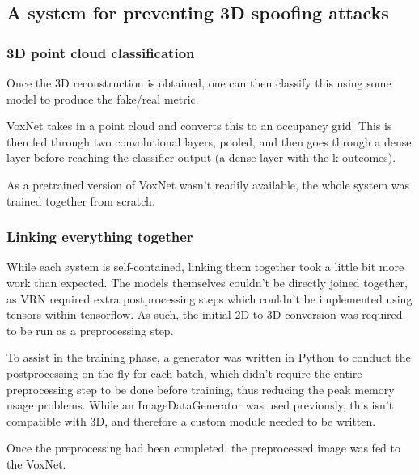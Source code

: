 \documentclass[10pt,a4paper]{article}
\begin{document}
        
    \subsection{A system for preventing 3D spoofing attacks}
        \subsubsection{3D point cloud classification}
            Once the 3D reconstruction is obtained, one can then classify this using some model to produce the fake/real metric.
            
            VoxNet takes in a point cloud and converts this to an occupancy grid. This is then fed through two convolutional layers,
            pooled, and then goes through a dense layer before reaching the classifier output (a dense layer with the k outcomes). 

            As a pretrained version of VoxNet wasn't readily available, the whole system was trained together from scratch.

        \subsubsection{Linking everything together}
            While each system is self-contained, linking them together took a little bit more work than expected. The models themselves couldn't be directly joined together,
            as VRN required extra postprocessing steps which couldn't be implemented using tensors within tensorflow. As such, the initial 2D to 3D conversion was required to be run
            as a preprocessing step.

            To assist in the training phase, a generator was written in Python to conduct the postprocessing on the fly for each batch, which didn't require the entire preprocessing step to be done before training, 
            thus reducing the peak memory usage problems. While an ImageDataGenerator was used previously, this isn't compatible with 3D, and therefore a custom module needed to be written.

            Once the preprocessing had been completed, the preprocessed image was fed to the VoxNet. 
\end{document}

